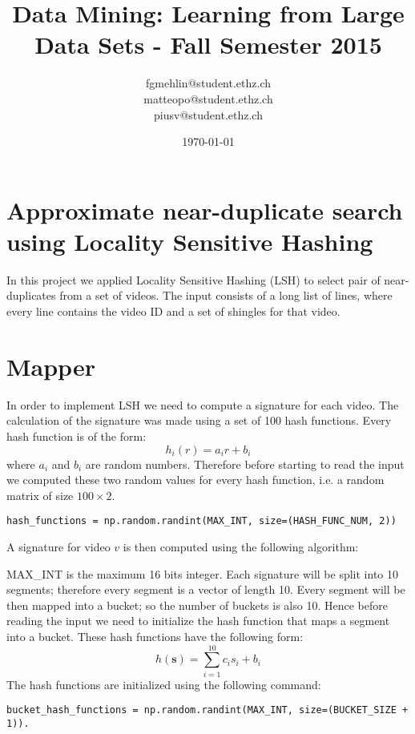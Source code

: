 \documentclass[a4paper, 11pt]{article}
\title{Data Mining: Learning from Large Data Sets - Fall Semester 2015}
\author{fgmehlin@student.ethz.ch\\ matteopo@student.ethz.ch\\ piusv@student.ethz.ch\\}
\date{\today}
\begin{document}
\maketitle

\section*{Approximate near-duplicate search using Locality Sensitive Hashing} 
In this project we applied Locality Sensitive Hashing (LSH) to select pair of near-duplicates from a set of videos. The input consists of a long list of lines, where every line contains the video ID and a set of shingles for that video. 
\section{Mapper}
In order to implement LSH we need to compute a signature for each video. The calculation of the signature was made using a set of 100 hash functions. Every hash function is of the form:
\begin{equation}
h_i(r) = a_ir + b_i
\end{equation}
where $a_i$ and $b_i$ are random numbers. Therefore before starting to read the input we computed these two random values for every hash function, i.e. a random matrix of size $100\times 2$.
\begin{lstlisting}
hash_functions = np.random.randint(MAX_INT, size=(HASH_FUNC_NUM, 2))
\end{lstlisting}
A signature for video $v$ is then computed using the following algorithm:
\begin{algorithm}
\end{algorithm}

MAX\_INT is the maximum 16 bits integer. Each signature will be split into 10 segments; therefore every segment is a vector of length 10. Every segment will be then mapped into a bucket; so the number of buckets is also 10. Hence before reading the input we need to initialize the hash function that maps a segment into a bucket. These hash functions have the following form:
\begin{equation}
h(\textbf{s}) = \sum_{i = 1}^{10} c_is_i + b_i
\end{equation}
The hash functions are initialized using the following command:
\begin{lstlisting}
bucket_hash_functions = np.random.randint(MAX_INT, size=(BUCKET_SIZE + 1)).
\end{lstlisting}
\end{document}
